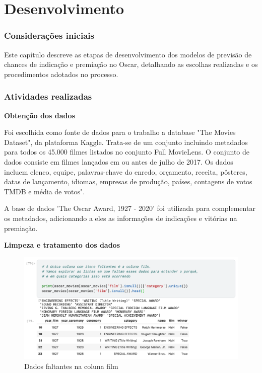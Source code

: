 \chapter[Desenvolvimento]{Desenvolvimento}
    \subsection{Considerações iniciais}
    Este capítulo descreve as etapas de desenvolvimento dos modelos de previsão de chances de indicação e premiação no Oscar, detalhando as escolhas realizadas e os procedimentos adotados no processo.

    \subsection{Atividades realizadas}

        \textbf{Obtenção dos dados}\par

        Foi escolhida como fonte de dados para o trabalho a database "The Movies Dataset", da plataforma Kaggle. Trata-se de um conjunto incluindo metadados para todos os 45.000 filmes listados no conjunto Full MovieLens. O conjunto de dados consiste em filmes lançados em ou antes de julho de 2017. Os dados incluem elenco, equipe, palavras-chave do enredo, orçamento, receita, pôsteres, datas de lançamento, idiomas, empresas de produção, países, contagens de votos TMDB e média de votos".\cite{kaggle2017}\par

        A base de dados 'The Oscar Award, 1927 - 2020' foi utilizada para complementar os metadados, adicionando a eles as informações de indicações e vitórias na premiação.\cite{kaggle2019}\newline

        \textbf{Limpeza e tratamento dos dados}\par
        
        \begin{figure}[htb]
        	\caption{\label{faltantes_film}Dados faltantes na coluna film}
        	\begin{center}
        		\includegraphics[scale=0.5]{faltantes_film.png}
        	\end{center}
        \end{figure}

